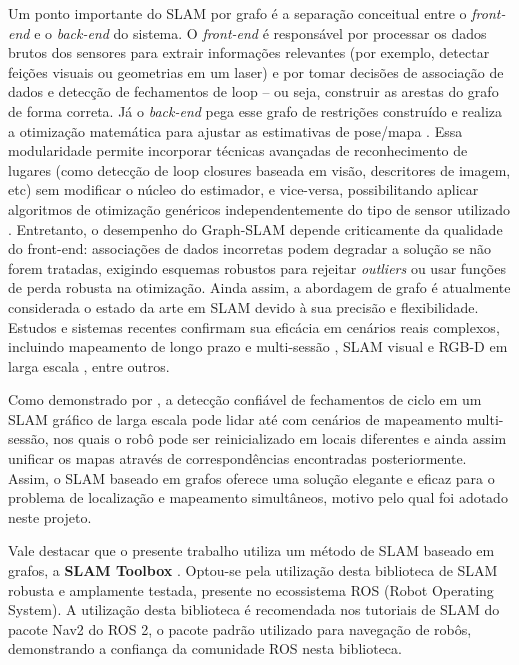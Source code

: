         Um ponto importante do SLAM por grafo é a separação conceitual entre o \textit{front-end} e o \textit{back-end} do sistema. O \textit{front-end} é responsável por processar os dados brutos dos sensores para extrair informações relevantes (por exemplo, detectar feições visuais ou geometrias em um laser) e por tomar decisões de associação de dados e detecção de fechamentos de loop – ou seja, construir as arestas do grafo de forma correta. Já o \textit{back-end} pega esse grafo de restrições construído e realiza a otimização matemática para ajustar as estimativas de pose/mapa \cite{Cadena2016}. Essa modularidade permite incorporar técnicas avançadas de reconhecimento de lugares (como detecção de loop closures baseada em visão, descritores de imagem, etc) sem modificar o núcleo do estimador, e vice-versa, possibilitando aplicar algoritmos de otimização genéricos independentemente do tipo de sensor utilizado \cite{Labbe2014}. Entretanto, o desempenho do Graph-SLAM depende criticamente da qualidade do front-end: associações de dados incorretas podem degradar a solução se não forem tratadas, exigindo esquemas robustos para rejeitar \textit{outliers} ou usar funções de perda robusta na otimização. Ainda assim, a abordagem de grafo é atualmente considerada o estado da arte em SLAM devido à sua precisão e flexibilidade. Estudos e sistemas recentes confirmam sua eficácia em cenários reais complexos, incluindo mapeamento de longo prazo e multi-sessão \cite{Labbe2014}, SLAM visual e RGB-D em larga escala \cite{MurArtal2017} \cite{Zhang2021}, entre outros.

        Como demonstrado por , a detecção confiável de fechamentos de ciclo em um SLAM gráfico de larga escala pode lidar até com cenários de mapeamento multi-sessão, nos quais o robô pode ser reinicializado em locais diferentes e ainda assim unificar os mapas através de correspondências encontradas posteriormente. Assim, o SLAM baseado em grafos oferece uma solução elegante e eficaz para o problema de localização e mapeamento simultâneos, motivo pelo qual foi adotado neste projeto.
        
        Vale destacar que o presente trabalho utiliza um método de SLAM baseado em grafos, a \textbf{SLAM Toolbox} \cite{site:Slam_toolbox}. Optou-se pela utilização desta biblioteca de SLAM robusta e amplamente testada, presente no ecossistema ROS (Robot Operating System). A utilização desta biblioteca é recomendada nos tutoriais de SLAM do pacote Nav2 do ROS 2, o pacote padrão utilizado para navegação de robôs, demonstrando a confiança da comunidade ROS nesta biblioteca. 
